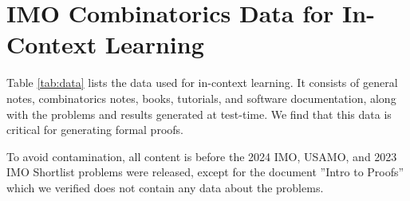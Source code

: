 \section{IMO Combinatorics Data for In-Context Learning}
\label{appendix:N}

Table \ref{tab:data} lists the data used for in-context learning. It consists of general notes, combinatorics notes, books, tutorials, and software documentation, along with the problems and results generated at test-time. We find that this data is critical for generating formal proofs.

To avoid contamination, all content is before the 2024 IMO, USAMO, and 2023 IMO Shortlist problems were released, except for the document ''Intro to Proofs'' \cite{chenimo2} which we verified does not contain any data about the problems.




